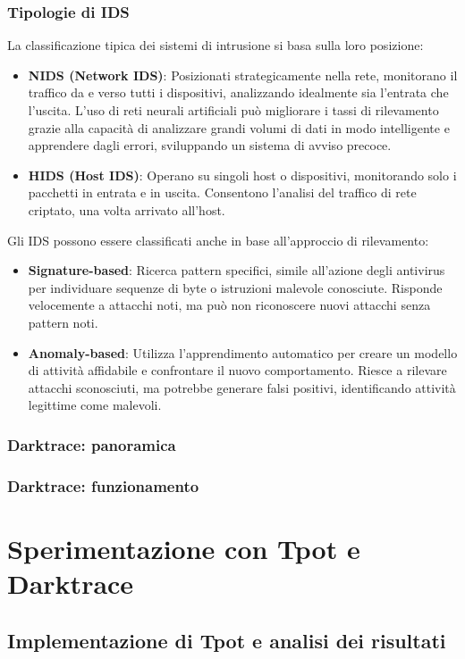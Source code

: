 \documentclass[12pt,a4paper,oneside,onecolumn,openright]{book}
\begin{document}
\subsection{Tipologie di IDS}
La classificazione tipica dei sistemi di intrusione si basa sulla loro posizione:
\begin{itemize}
	\item \textbf{NIDS (Network IDS)}: Posizionati strategicamente nella rete, 
	monitorano il traffico da e verso tutti i dispositivi, analizzando idealmente 
	sia l'entrata che l'uscita. L'uso di reti neurali artificiali può migliorare i 
	tassi di rilevamento grazie alla capacità di analizzare grandi volumi di dati 
	in modo intelligente e apprendere dagli errori, sviluppando un sistema di avviso precoce.
	\item \textbf{HIDS (Host IDS)}: Operano su singoli host o dispositivi, monitorando 
	solo i pacchetti in entrata e in uscita. Consentono l'analisi del traffico di rete 
	criptato, una volta arrivato all'host.
\end{itemize}
Gli IDS possono essere classificati anche in base all'approccio di rilevamento:
\begin{itemize}
	\item \textbf{Signature-based}: Ricerca pattern specifici, simile all'azione degli 
	antivirus per individuare sequenze di byte o istruzioni malevole conosciute. 
	Risponde velocemente a attacchi noti, ma può non riconoscere nuovi attacchi senza pattern noti.
	\item \textbf{Anomaly-based}: Utilizza l'apprendimento automatico per creare un 
	modello di attività affidabile e confrontare il nuovo comportamento. Riesce a 
	rilevare attacchi sconosciuti, ma potrebbe generare falsi positivi, identificando 
	attività legittime come malevoli.
\end{itemize}

\subsection{Darktrace: panoramica}
\subsection{Darktrace: funzionamento}

\chapter{Sperimentazione con Tpot e Darktrace}
\section{Implementazione di Tpot e analisi dei risultati}
\end{document}
